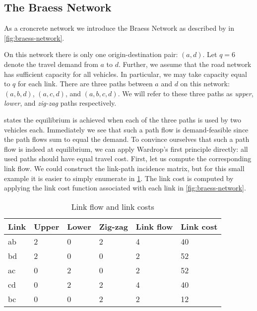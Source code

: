 \subsection{The Braess Network}

As a croncrete network we introduce the Braess Network as described by \citet{Murchland1970} in \cref{fig:braess-network}.



On this network there is only one origin-destination pair: $(a, d)$.
Let $q=6$ denote the travel demand from $a$ to $d$.
Further, we assume that the road network has sufficient capacity for all vehicles.
In particular, we may take capacity equal to $q$ for each link. 
There are three paths between $a$ and $d$ on this network: $(a, b, d)$, $(a,c,d)$, and $(a, b, c, d)$.
We will refer to these three paths as \textit{upper}, \textit{lower}, and \textit{zig-zag} paths respectively.

\citet{Murchland1970} states the equilibrium is achieved when each of the three paths is used by two vehicles each.
Immediately we see that such a path flow is demand-feasible since the path flows sum to equal the demand.
To convince ourselves that such a path flow is indeed at equilibrium, we can apply Wardrop's first principle directly: all used paths should have equal travel cost.
First, let us compute the corresponding link flow.
We could construct the link-path incidence matrix, but for this small example it is easier to simply enumerate in \cref{tab:braess:equilibrium-costs}.
The link cost is computed by applying the link cost function associated with each link in \cref{fig:braess-network}.

\begin{table}[!ht]
\centering
\caption{Link flow and link costs}\label{tab:braess:equilibrium-costs}
\begin{tabular}{@{}l|lll|ll@{}}
\toprule
Link & Upper & Lower & Zig-zag & Link flow & Link cost \\ \midrule
ab   & 2     & 0     & 2       & 4         & 40        \\
bd   & 2     & 0     & 0       & 2         & 52        \\
ac   & 0     & 2     & 0       & 2         & 52        \\
cd   & 0     & 2     & 2       & 4         & 40        \\
bc   & 0     & 0     & 2       & 2         & 12        \\ \bottomrule
\end{tabular}
\end{table}

